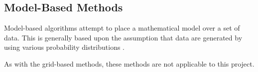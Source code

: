 \subsection{Model-Based Methods}
Model-based algorithms attempt to place a mathematical model over a set of data. 
This is generally based upon the assumption that data are generated by using 
various probability distributions \citep{han06}.

As with the grid-based methods, these methods are not applicable to this 
project.